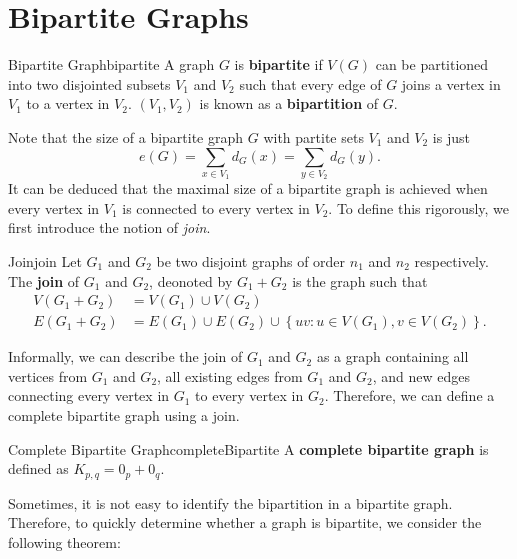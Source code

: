 \documentclass[math]{amznotes}
\theoremstyle{remark}
\begin{document}
\section{Bipartite Graphs}
\begin{dfnbox}{Bipartite Graph}{bipartite}
    A graph $G$ is {\color{red} \textbf{bipartite}} if $V(G)$ can be partitioned into two disjointed subsets $V_1$ and $V_2$ such that every edge of $G$ joins a vertex in $V_1$ to a vertex in $V_2$. $(V_1, V_2)$ is known as a {\color{red} \textbf{bipartition}} of $G$.
\end{dfnbox}
Note that the size of a bipartite graph $G$ with partite sets $V_1$ and $V_2$ is just
\begin{equation*}
    e(G) = \sum_{x \in V_1}d_G(x) = \sum_{y \in V_2}d_G(y).
\end{equation*}
It can be deduced that the maximal size of a bipartite graph is achieved when every vertex in $V_1$ is connected to every vertex in $V_2$. To define this rigorously, we first introduce the notion of \textit{join}.
\begin{dfnbox}{Join}{join}
    Let $G_1$ and $G_2$ be two disjoint graphs of order $n_1$ and $n_2$ respectively. The {\color{red} \textbf{join}} of $G_1$ and $G_2$, deonoted by $G_1 + G_2$ is the graph such that
    \begin{align*}
        V(G_1 + G_2) & = V(G_1) \cup V(G_2) \\
        E(G_1 + G_2) & = E(G_1) \cup E(G_2) \cup \left\{uv \colon u \in V(G_1), v \in V(G_2)\right\}.
    \end{align*}
\end{dfnbox}
Informally, we can describe the join of $G_1$ and $G_2$ as a graph containing all vertices from $G_1$ and $G_2$, all existing edges from $G_1$ and $G_2$, and new edges connecting every vertex in $G_1$ to every vertex in $G_2$. Therefore, we can define a complete bipartite graph using a join.
\begin{dfnbox}{Complete Bipartite Graph}{completeBipartite}
    A {\color{red} \textbf{complete bipartite graph}} is defined as $K_{p, q} = 0_p + 0_q$.
\end{dfnbox}
Sometimes, it is not easy to identify the bipartition in a bipartite graph. Therefore, to quickly determine whether a graph is bipartite, we consider the following theorem:
\end{document}
